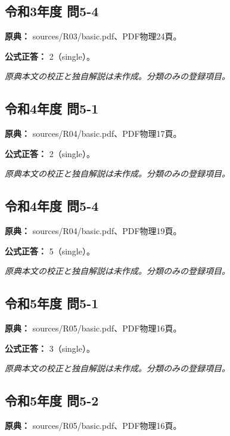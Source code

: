 \subsection{令和3年度 問5-4}
\label{q:r03-reg-basic-5-4}

\noindent\textbf{原典：} sources/R03/basic.pdf、PDF物理24頁。

\textbf{公式正答：} 2（single）。

\par\textit{原典本文の校正と独自解説は未作成。分類のみの登録項目。}

\subsection{令和4年度 問5-1}
\label{q:r04-reg-basic-5-1}

\noindent\textbf{原典：} sources/R04/basic.pdf、PDF物理17頁。

\textbf{公式正答：} 2（single）。

\par\textit{原典本文の校正と独自解説は未作成。分類のみの登録項目。}

\subsection{令和4年度 問5-4}
\label{q:r04-reg-basic-5-4}

\noindent\textbf{原典：} sources/R04/basic.pdf、PDF物理19頁。

\textbf{公式正答：} 5（single）。

\par\textit{原典本文の校正と独自解説は未作成。分類のみの登録項目。}

\subsection{令和5年度 問5-1}
\label{q:r05-reg-basic-5-1}

\noindent\textbf{原典：} sources/R05/basic.pdf、PDF物理16頁。

\textbf{公式正答：} 3（single）。

\par\textit{原典本文の校正と独自解説は未作成。分類のみの登録項目。}

\subsection{令和5年度 問5-2}
\label{q:r05-reg-basic-5-2}

\noindent\textbf{原典：} sources/R05/basic.pdf、PDF物理16頁。

